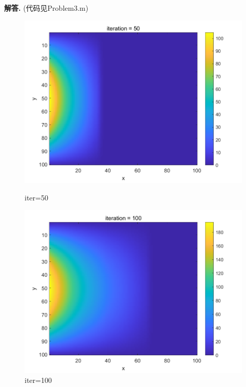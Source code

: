 \documentclass[12pt, a4paper, oneside, UTF8]{ctexart}
\newenvironment{solution}{\par\noindent\textbf{解答. }}{\par}
\begin{document}
\begin{solution}
    (代码见Problem3.m)
    \begin{figure}[h]
        \centering
        \begin{minipage}[b]{0.3\textwidth}
            \centering
            \includegraphics[width=\textwidth]{Problem3_1.png}
            \caption{iter=50}
        \end{minipage}
        \begin{minipage}[b]{0.3\textwidth}
            \centering
            \includegraphics[width=\textwidth]{Problem3_2.png}
            \caption{iter=100}
        \end{minipage}
        \begin{minipage}[b]{0.3\textwidth}

\end{minipage}
\end{figure}
\end{solution}
\end{document}
